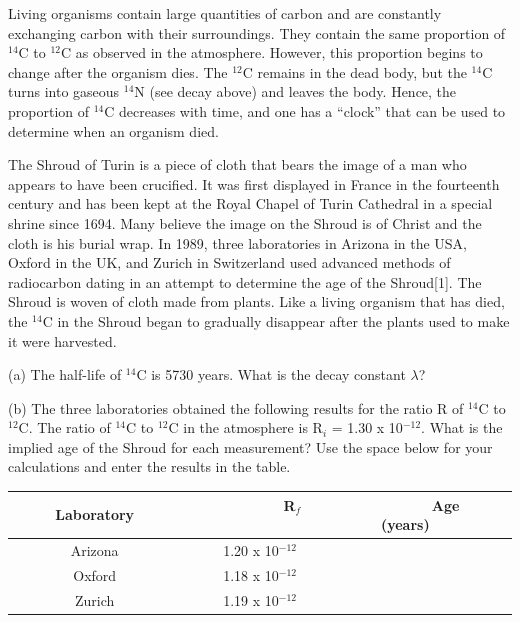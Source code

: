 Living organisms contain large quantities of carbon and are constantly
exchanging carbon with their surroundings. They contain the same proportion
of \( ^{14} \)C to \( ^{12} \)C as observed in the atmosphere. However,
this proportion begins to change after the organism dies. The \( ^{12} \)C
remains in the dead body, but the \( ^{14} \)C turns into gaseous
\( ^{14} \)N (see decay above) and leaves the body. Hence, the proportion
of \( ^{14} \)C decreases with time, and one has a {}``clock''
that can be used to determine when an organism died. 

The Shroud of Turin is a piece of cloth that bears the image of a
man who appears to have been crucified. It was first displayed in
France in the fourteenth century and has been kept at the Royal Chapel
of Turin Cathedral in a special shrine since 1694. Many believe the
image on the Shroud is of Christ and the cloth is his burial wrap.
In 1989, three laboratories in Arizona in the USA, Oxford in the UK,
and Zurich in Switzerland used advanced methods of radiocarbon dating
in an attempt to determine the age of the Shroud{[}1{]}. The Shroud
is woven of cloth made from plants. Like a living organism that has
died, the \( ^{14} \)C in the Shroud began to gradually disappear
after the plants used to make it were harvested.

(a) The half-life of \( ^{14} \)C is 5730 years. What is the decay
constant \( \lambda  \)?
\vspace{25mm}

\newpage

(b) The three laboratories obtained the following results for the
ratio R of \( ^{14} \)C to \( ^{12} \)C. The ratio of \( ^{14} \)C
to \( ^{12} \)C in the atmosphere is R\( _{i} \) = 1.30 x 10\( ^{-12} \).
What is the implied age of the Shroud for each measurement? Use the
space below for your calculations and enter the results in the table. 

\vspace{0.3cm}
{\centering \begin{tabular}{|c|c|c|}
\hline 
~~~~~Laboratory~~~~~&
~~~~~~~~R\( _{f} \)~~~~~~~~&
~~~~~Age (years)~~~~~\\
\hline
\hline 
Arizona&
1.20 x 10\( ^{-12} \)&
\\
\hline 
Oxford&
1.18 x 10\( ^{-12} \)&
\\
\hline 
Zurich&
1.19 x 10\( ^{-12} \)&
\\
\hline
\end{tabular}\par}
\vspace{0.3cm}

